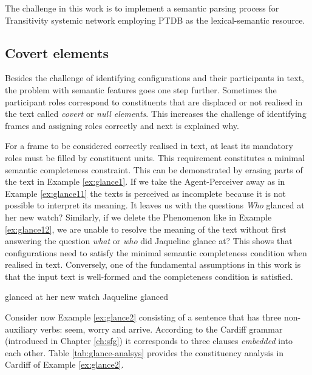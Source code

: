 The challenge in this work is to implement a semantic parsing process for Transitivity systemic network employing PTDB as the lexical-semantic resource. 

\subsection{Covert elements}

Besides the challenge of identifying configurations and their participants in text, the problem with semantic features goes one step further. Sometimes the participant roles correspond to constituents that are displaced or not realised in the text called \textit{covert}\citep[115,135,194]{Fawcett2008} or \textit{null elements}\citep{Chomsky81, Chomsky1982, Chomsky1986}. This increases the challenge of identifying frames and assigning roles correctly and next is explained why. 

For a frame to be considered correctly realised in text, at least its mandatory roles must be filled by constituent units. This requirement constitutes a minimal semantic completeness constraint. This can be demonstrated by erasing parts of the text in Example \ref{ex:glance1}. If we take the Agent-Perceiver away as in Example \ref{ex:glance11} the texts is perceived as incomplete because it is not possible to interpret its meaning. It leaves us with the questions \textit{Who} glanced at her new watch? Similarly, if we delete the Phenomenon like in Example \ref{ex:glance12}, we are unable to resolve the meaning of the text without first answering the question \textit{what} or \textit{who} did Jaqueline glance at? This shows that  configurations need to satisfy the minimal semantic completeness condition when realised in text. Conversely, one of the fundamental assumptions in this work is that the input text is well-formed and the completeness condition is satisfied.

\begin{exe}
    \ex\label{ex:glance11} glanced at her new watch
    \ex\label{ex:glance12} Jaqueline glanced
\end{exe}

Consider now Example \ref{ex:glance2} consisting of a sentence that has three non-auxiliary verbs: seem, worry and arrive. According to the Cardiff grammar (introduced in Chapter \ref{ch:sfg}) it corresponds to three clauses \textit{embedded} into each other. Table \ref{tab:glance-analsys} provides the constituency analysis in Cardiff of Example \ref{ex:glance2}.

